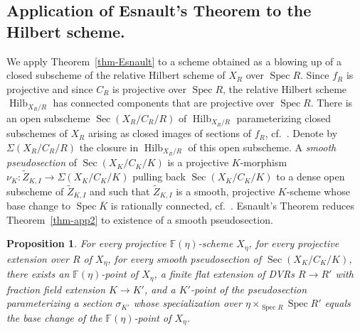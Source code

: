 \documentclass[11pt]{article}
\newtheorem{prop}[theo]{Proposition}
\theoremstyle{definition}
\numberwithin{equation}{section}
\numberwithin{figure}{section}
\numberwithin{table}{section}
\newcommand{\mbb}{\mathbb}
\newcommand{\FF}{\mbb{F}}
\newcommand{\wt}{\widetilde}
\newcommand{\ol}{\overline}
\newcommand{\Xx}{X}
\newcommand{\Cc}{C}
\newcommand{\Rr}{R}
\newcommand{\FR}{K}
\DeclareMathOperator{\SP}{Spec}
\DeclareMathOperator{\Hilb}{Hilb}
\DeclareMathOperator{\Sec}{Sec}
\begin{document}
\subsection{Application of Esnault's Theorem to the Hilbert scheme.} \label{subsec-Hilb}
We apply Theorem~\ref{thm-Esnault} to a scheme obtained as a blowing up of a closed subscheme of the relative Hilbert scheme of $\Xx_\Rr$ over $\SP \Rr$. Since $f_\Rr$ is projective and since $\Cc_\Rr$ is projective over $\SP \Rr$, the relative Hilbert scheme $\Hilb_{\Xx_\Rr/\Rr}$ has connected components that are projective over $\SP \Rr$. There is an open subscheme $\Sec(\Xx_\Rr/\Cc_\Rr/\Rr)$ of $\Hilb_{\Xx_\Rr/\Rr}$ parameterizing closed subschemes of $\Xx_\Rr$ arising as closed images of sections of $f_\Rr$, cf.~\cite[Part IV.4.c, p.~221--219]{FGA}. Denote by $\Sigma(\Xx_\Rr/\Cc_\Rr/\Rr)$ the closure in $\Hilb_{\Xx_\Rr/\Rr}$ of this open subscheme. A \emph{smooth pseudosection} of $\Sec(\Xx_\FR/\Cc_\FR/\FR)$ is a projective $\FR$-morphism $\nu_\FR:\wt{Z}_{\FR,I}\to \Sigma(\Xx_\FR/\Cc_\FR/\FR)$ pulling back $\Sec(\Xx_\FR/\Cc_\FR/\FR)$ to a dense open subscheme of $\wt{Z}_{\FR,I}$ and such that $\wt{Z}_{\FR,I}$ is a smooth, projective $\FR$-scheme whose base change to $\SP \ol{\FR}$ is rationally connected, cf.~\cite[Definition~1.2]{GHMS}. Esnault's Theorem reduces Theorem~\ref{thm-app2} to existence of a smooth pseudosection.

\begin{prop}\label{prop-pseudo}
For every projective $\FF(\eta)$-scheme $\Xx_\eta$, for every projective extension over $\Rr$ of $\Xx_\eta$, for every smooth pseudosection of $\Sec(\Xx_\FR/\Cc_\FR/\FR)$, there exists an $\FF(\eta)$-point of $\Xx_\eta$, a finite flat extension of DVRs $\Rr \to \Rr'$ with fraction field extension $\FR\to \FR'$, and a $\FR'$-point of the pseudosection parameterizing a section $\sigma_{\FR'}$ whose specialization over $\eta \times_{\SP \Rr}\SP \Rr'$ equals the base change of the $\FF(\eta)$-point of $\Xx_\eta$.
\end{prop}
\end{document}
